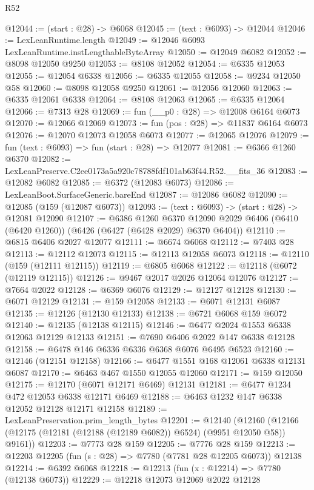 \begin{lexlean}{R52}
\begin{coremodule}
@12044 := (start : @28) -> @6068
@12045 := (text : @6093) -> @12044
@12046 := LexLeanRuntime.length
@12049 := @12046 @6093 LexLeanRuntime.instLengthableByteArray
@12050 := @12049 @6082
@12052 := @8098 @12050 @9250
@12053 := @8108 @12052
@12054 := @6335 @12053
@12055 := @12054 @6338
@12056 := @6335 @12055
@12058 := @9234 @12050 @58
@12060 := @8098 @12058 @9250
@12061 := @12056 @12060
@12063 := @6335 @12061 @6338
@12064 := @8108 @12063
@12065 := @6335 @12064
@12066 := @7313 @28
@12069 := fun (__p0 : @28) => @12008 @6164 @6073
@12070 := @12066 @12069
@12073 := fun (pos : @28) => @11837 @6164 @6073
@12076 := @12070 @12073 @12058 @6073
@12077 := @12065 @12076
@12079 := fun (text : @6093) => fun (start : @28) => @12077
@12081 := @6366 @1260 @6370
@12082 := LexLeanPreserve.C2ee0173a5a920c78788fdf101ab63f44.R52.__fits_36
@12083 := @12082 @6082
@12085 := @6372 (@12083 @6073)
@12086 := LexLeanBoot.SurfaceGeneric.bareEnd
@12087 := @12086 @6082
@12090 := @12085 (@159 (@12087 @6073))
@12093 := (text : @6093) -> (start : @28) -> @12081 @12090
@12107 := @6386
    @1260
    @6370
    @12090
    @2029
    @6406
    (@6410 (@6420 @1260))
    (@6426 (@6427 (@6428 @2029) @6370 @6404))
@12110 := @6815 @6406 @2027 @12077
@12111 := @6674 @6068
@12112 := @7403 @28
@12113 := @12112 @12073
@12115 := @12113 @12058 @6073
@12118 := @12110 (@159 (@12111 @12115))
@12119 := @6805 @6068
@12122 := @12118 (@6072 (@12119 @12115))
@12126 := @9467 @2017 @2026 @12064 @12076
@12127 := @7664 @2022
@12128 := @6369 @6076
@12129 := @12127 @12128
@12130 := @6071 @12129
@12131 := @159 @12058
@12133 := @6071 @12131 @6087
@12135 := @12126 (@12130 @12133)
@12138 := @6721 @6068 @159 @6072
@12140 := @12135 (@12138 @12115)
@12146 := @6477 @2024 @1553 @6338 @12063 @12129 @12133
@12151 := @7690 @6406 @2022 @147 @6338 @12128
@12158 := @6478 @146 @6336 @6336 @6368 @6076 @6495 @6523
@12160 := @12146 (@12151 @12158)
@12166 := @6477 @1551 @168 @12061 @6338 @12131 @6087
@12170 := @6463 @467 @1550 @12055 @12060
@12171 := @159 @12050
@12175 := @12170 (@6071 @12171 @6469) @12131
@12181 := @6477 @1234 @472 @12053 @6338 @12171 @6469
@12188 := @6463 @1232 @147 @6338 @12052 @12128 @12171 @12158
@12189 := LexLeanPreservation.prim_length_bytes
@12201 := @12140
    (@12160 (@12166 (@12175 (@12181 (@12188 (@12189 @6082)) @6524) (@9951 @12050 @58)) @9161))
@12203 := @7773 @28 @159
@12205 := @7776 @28 @159
@12213 := @12203 @12205 (fun (s : @28) => @7780 (@7781 @28 @12205 @6073)) @12138
@12214 := @6392 @6068
@12218 := @12213 (fun (x : @12214) => @7780 (@12138 @6073))
@12229 := @12218
    @12073
    @12069
    @2022
    @12128

\end{coremodule}
\end{lexlean}
